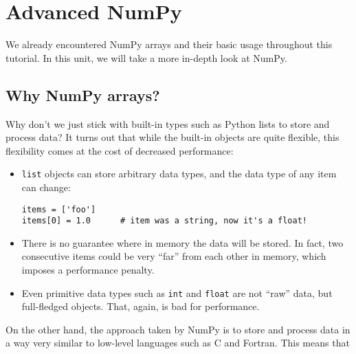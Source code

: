\documentclass[10pt]{scrartcl}
\begin{document}
    
    \maketitle
    \tableofcontents

    

    
    \hypertarget{advanced-numpy}{%
\section{Advanced NumPy}\label{advanced-numpy}}

We already encountered NumPy arrays and their basic usage throughout
this tutorial. In this unit, we will take a more in-depth look at NumPy.

\hypertarget{why-numpy-arrays}{%
\subsection{Why NumPy arrays?}\label{why-numpy-arrays}}

Why don't we just stick with built-in types such as Python lists to
store and process data? It turns out that while the built-in objects are
quite flexible, this flexibility comes at the cost of decreased
performance:

\begin{itemize}
\item
  \texttt{list} objects can store arbitrary data types, and the data
  type of any item can change:

\begin{verbatim}
items = ['foo']
items[0] = 1.0      # item was a string, now it's a float!
\end{verbatim}
\item
  There is no guarantee where in memory the data will be stored. In
  fact, two consecutive items could be very ``far'' from each other in
  memory, which imposes a performance penalty.
\item
  Even primitive data types such as \texttt{int} and \texttt{float} are
  not ``raw'' data, but full-fledged objects. That, again, is bad for
  performance.
\end{itemize}

On the other hand, the approach taken by NumPy is to store and process
data in a way very similar to low-level languages such as C and Fortran.
This means that
\end{document}
